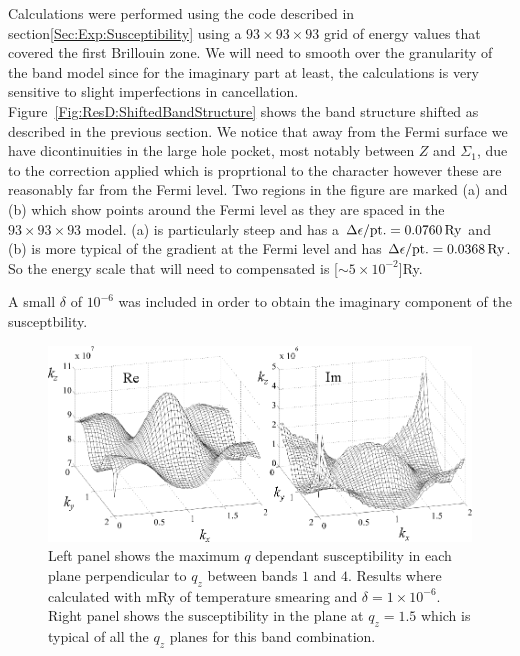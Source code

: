 Calculations were performed using the  code described in section\ref{Sec:Exp:Susceptibility} using a $93\times93\times93$ grid of energy values that covered the first Brillouin zone. We will need to smooth over the granularity of the \WIEN band model since for the imaginary part at least, the calculations is very sensitive to slight imperfections in cancellation. Figure~\ref{Fig:ResD:ShiftedBandStructure} shows the band structure shifted as described in the previous section. We notice that away from the Fermi surface we have dicontinuities in the large hole pocket, most notably between $Z$ and $\Sigma_1$, due to the correction applied which is proprtional to the \DzTwo character however these are reasonably far from the Fermi level. Two regions in the figure are marked (a) and (b) which show points around the Fermi level as they are spaced in the $93\times93\times93$ model. (a) is particularly steep and has a $\Delta \epsilon/\textrm{pt.} = \unit[0.0760]{Ry}$ and (b) is more typical of the gradient at the Fermi level and has $\Delta \epsilon/\textrm{pt.} = \unit[0.0368]{Ry}$. So the energy scale that will need to compensated is \unit[$\sim 5\times10^{-2}$]{Ry}.



A small $\delta$ of $10^{-6}$ was included in order to obtain the imaginary component of the susceptbility.

\begin{figure}[htbp]
    \begin{center}
        \includegraphics[scale=0.9]{Chapter-dHvABaFe2P2/Figures/Susceptibility/2DSusceptibility/2DSusceptibility}
        \caption{Left panel shows the maximum $q$ dependant susceptibility in each plane perpendicular to $q_z$ between bands $1$ and $4$. Results where calculated with \unit[1]{mRy} of temperature smearing and $\delta=1\times10^{-6}$. Right panel shows the susceptibility in the plane at $q_z=1.5$ which is typical of all the $q_z$ planes for this band combination.}
        \label{Fig:ResD:SusceptbilityEnhancement}
    \end{center}
\end{figure}

